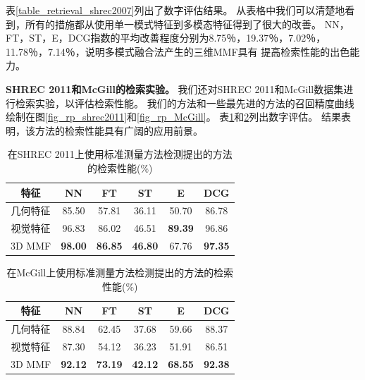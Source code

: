 表\ref {table_retrieval_shrec2007}列出了数字评估结果。 从表格中我们可以清楚地看到，所有的措施都从使用单一模式特征到多模态特征得到了很大的改善。 NN，FT，ST，E，DCG指数的平均改善程度分别为8.75％，19.37％，7.02％，11.78％，7.14％，说明多模式融合法产生的三维MMF具有 提高检索性能的出色能力。




\textbf{SHREC 2011和McGill的检索实验。}
我们还对SHREC 2011和McGill数据集进行检索实验，以评估检索性能。 我们的方法和一些最先进的方法的召回精度曲线绘制在图\ref {fig_rp_shrec2011}和\ref {fig_rp_McGill}。 表\ref {table_retrieval_results_shrec2011}和\ref {table_retrieval_results_McGill}列出数字评估。 结果表明，该方法的检索性能具有广阔的应用前景。

\begin{table}[tbhp]
\caption{在SHREC 2011上使用标准测量方法检测提出的方法的检索性能(\%)} \label{table_retrieval_results_shrec2011}
\begin{center}
\begin{tabular}{cccccc}  %
\hline  \hline
特征                 &NN &FT &ST &E &DCG\\ 
\hline
几何特征  &85.50 &57.81 &36.11 &50.70 &86.78   \\ 
视觉特征     &96.83 &86.02 &46.51 &\textbf{89.39} &96.86\\                   
3D MMF              &\textbf{98.00} &\textbf{86.85} &\textbf{46.80} &67.76 &\textbf{97.35}\\  
\hline  \hline      %
\end{tabular}
\end{center} 
\end{table}



\begin{table}[tbhp]

\caption{在McGill上使用标准测量方法检测提出的方法的检索性能(\%)}\label{table_retrieval_results_McGill}
\begin{center}
\begin{tabular}{cccccc}  %
\hline  \hline
特征                 &NN &FT &ST &E &DCG\\ 
\hline
几何特征   &88.84 &62.45 &37.68 &59.66 &88.37    \\ 
视觉特征      &87.30 &54.12 &36.23 &51.91 &86.51\\                   
3D MMF              &\textbf{92.12} &\textbf{73.19} &\textbf{42.12} &\textbf{68.55} &\textbf{92.38}\\  
\hline  \hline      %
\end{tabular}
\end{center} 
\end{table}

